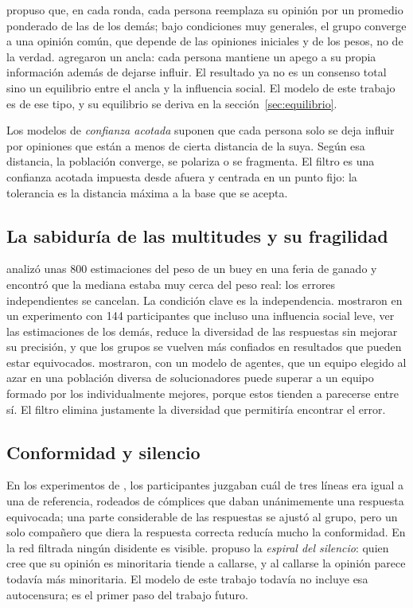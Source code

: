 \documentclass[11pt,a4paper]{article}
\begin{document}
\textcite{degroot1974} propuso que, en cada ronda, cada persona reemplaza su opinión por un promedio ponderado de las de los demás; bajo condiciones muy generales, el grupo converge a una opinión común, que depende de las opiniones iniciales y de los pesos, no de la verdad. \textcite{friedkin1990} agregaron un ancla: cada persona mantiene un apego a su propia información además de dejarse influir. El resultado ya no es un consenso total sino un equilibrio entre el ancla y la influencia social. El modelo de este trabajo es de ese tipo, y su equilibrio se deriva en la sección~\ref{sec:equilibrio}.

Los modelos de \emph{confianza acotada} \parencite{deffuant2000,hegselmann2002} suponen que cada persona solo se deja influir por opiniones que están a menos de cierta distancia de la suya. Según esa distancia, la población converge, se polariza o se fragmenta. El filtro es una confianza acotada impuesta desde afuera y centrada en un punto fijo: la tolerancia es la distancia máxima a la base que se acepta.

\subsection{La sabiduría de las multitudes y su fragilidad}

\textcite{galton1907} analizó unas 800 estimaciones del peso de un buey en una feria de ganado y encontró que la mediana estaba muy cerca del peso real: los errores independientes se cancelan. La condición clave es la independencia. \textcite{lorenz2011} mostraron en un experimento con 144 participantes que incluso una influencia social leve, ver las estimaciones de los demás, reduce la diversidad de las respuestas sin mejorar su precisión, y que los grupos se vuelven más confiados en resultados que pueden estar equivocados. \textcite{hong2004} mostraron, con un modelo de agentes, que un equipo elegido al azar en una población diversa de solucionadores puede superar a un equipo formado por los individualmente mejores, porque estos tienden a parecerse entre sí. El filtro elimina justamente la diversidad que permitiría encontrar el error.

\subsection{Conformidad y silencio}

En los experimentos de \textcite{asch1956}, los participantes juzgaban cuál de tres líneas era igual a una de referencia, rodeados de cómplices que daban unánimemente una respuesta equivocada; una parte considerable de las respuestas se ajustó al grupo, pero un solo compañero que diera la respuesta correcta reducía mucho la conformidad. En la red filtrada ningún disidente es visible. \textcite{noelleneumann1974} propuso la \emph{espiral del silencio}: quien cree que su opinión es minoritaria tiende a callarse, y al callarse la opinión parece todavía más minoritaria. El modelo de este trabajo todavía no incluye esa autocensura; es el primer paso del trabajo futuro.
\end{document}
